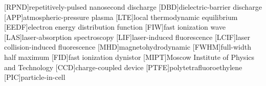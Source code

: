 [RPND]{repetitively-pulsed nanosecond discharge}
[DBD]{dielectric-barrier discharge}
[APP]{atmospheric-pressure plasma}
[LTE]{local thermodynamic equilibrium}
[EEDF]{electron energy distribution function}
[FIW]{fast ionization wave}
[LAS]{laser-absorption spectroscopy}
[LIF]{laser-induced fluorescence}
[LCIF]{laser collision-induced fluorescence}
[MHD]{magnetohydrodynamic}
[FWHM]{full-width half maximum}
[FID]{fast ionization dynistor}
[MIPT]{Moscow Institute of Physics and Technology}
[CCD]{charge-coupled device}
[PTFE]{polytetrafluoroethylene}
[PIC]{particle-in-cell}
